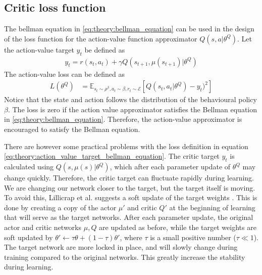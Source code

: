 \documentclass[class=book, crop=false, 11pt]{standalone}
\begin{document}
\subsection{Critic loss function}
The bellman equation in \eqref{eq:theory:bellman_equation} can be used in the design of the loss function for the action-value function approximator $Q(s,a|\theta^{Q})$. Let the action-value target $y_{t}$ be defined as 
\begin{equation}
   \begin{aligned}\label{eq:theory:action_value_target_bellman_equation}
y_{t} = r(s_{t},a_{t}) + \gamma Q(s_{t+1},\mu(s_{t+1})|\theta^{Q})
\end{aligned} 
\end{equation}
The action-value loss can be defined as 
\begin{equation}
   \begin{aligned}\label{eq:theory:action_value_loss_bellman_equation}
L(\theta^{Q}) 
&= \mathbb{E}_
{s_{t}\sim\rho^{\beta},a_{t} \sim \beta, r_{t} \sim \mathcal{E}}
[Q(s_{t},a_{t}|\theta^{Q})- y_{t})^{2}]
\end{aligned} 
\end{equation}
Notice that the state and action follows the distribution of the behavioural policy $\beta$. The loss is zero if the action value approximator satisfies the Bellman equation in \eqref{eq:theory:bellman_equation}. Therefore, the action-value approximator is encouraged to satisfy the Bellman equation.

There are however some practical problems with the loss definition in equation \eqref{eq:theory:action_value_target_bellman_equation}. The critic target $y_{t}$ is calculated using $Q(s,\mu(s)|\theta^{Q})$, which after each parameter update of $\theta^{Q}$ may change quickly. Therefore, the critic target can fluctuate rapidly during learning. We are changing our network closer to the target, but the target itself is moving. To avoid this, Lillicrap et al. suggests a soft update of the target weights \cite{DBLP:journals/corr/LillicrapHPHETS15}. This is done by creating a copy of the actor $\mu'$ and critic $Q'$ at the beginning of learning that will serve as the target networks. After each parameter update, the original actor and critic networks $\mu,Q$ are updated as before, while the target weights are soft updated by $\theta' \leftarrow \tau\theta + (1-\tau)\theta'$, where $\tau$ is a small positive number ($\tau  \ll 1$). The target network are more locked in place, and will slowly change during training compared to the original networks. This greatly increase the stability during learning. 
\end{document}
